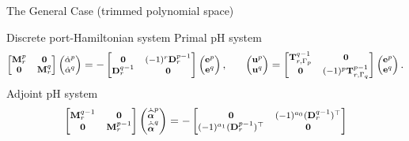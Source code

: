 \documentclass[aspectratio=169]{beamer}
\newcommand*{\dual}[1]{\ensuremath{\widehat{#1}}}
\begin{document}
\begin{frame}{The General Case (trimmed polynomial space) }
\end{frame}

\begin{frame}{Discrete port-Hamiltonian system}
	Primal pH system
	\begin{equation*}\footnotesize
		\begin{bmatrix}
			\mathbf{M}^p_r & \mathbf{0} \\
			\mathbf{0} & \mathbf{M}^q_r
		\end{bmatrix}
		\begin{pmatrix}
			\dot{{\alpha}}^p \\
			\dot{{\alpha}}^q
		\end{pmatrix} = -
		\begin{bmatrix}
			\mathbf{0} & (-1)^r\mathbf{D}^{p-1}_r \\
			\mathbf{D}^{q-1}_r & \mathbf{0}
		\end{bmatrix}
		\begin{pmatrix}
			\mathbf{e}^p \\
			\mathbf{e}^q
		\end{pmatrix}, \qquad
		\begin{pmatrix}
			\mathbf{u}^p \\
			\mathbf{u}^q \\
		\end{pmatrix} = 
		\begin{bmatrix}
			\mathbf{T}^{q-1}_{r, \Gamma_p} & \mathbf{0} \\
			\mathbf{0} & (-1)^p\mathbf{T}^{p-1}_{r, \Gamma_q} \\
		\end{bmatrix}
		\begin{pmatrix}
			\mathbf{e}^p \\
			\mathbf{e}^q
		\end{pmatrix}.
	\end{equation*}
Adjoint pH system
\begin{equation*}\footnotesize
	\begin{bmatrix}
		\mathbf{M}^{q-1}_r & \mathbf{0} \\
		\mathbf{0} & \mathbf{M}^{p-1}_r
	\end{bmatrix}
	\begin{pmatrix}
		\dot{\dual{\bm{\alpha}}}^p \\
		\dot{\dual{\bm{\alpha}}}^q
	\end{pmatrix} = -
	\begin{bmatrix}
		\mathbf{0} & (-1)^{a_0}(\mathbf{D}_r^{q-1})^\top\\
		(-1)^{a_1}(\mathbf{D}_r^{p-1})^\top & \mathbf{0}

\end{bmatrix}
\end{equation*}
\end{frame}
\end{document}
